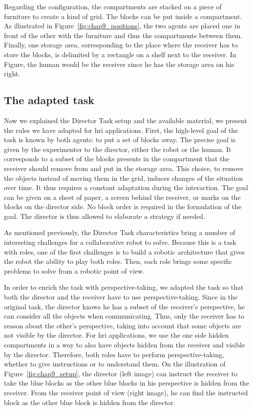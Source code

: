 Regarding the configuration, the compartments are stacked on a piece of furniture to create a kind of grid. The blocks can be put inside a compartment. As illustrated in Figure~\ref{fig:chap9_positions}, the two agents are placed one in front of the other with the furniture and thus the compartments between them. Finally, one storage area, corresponding to the place where the receiver has to store the blocks, is delimited by a rectangle on a shelf next to the receiver. In Figure, the human would be the receiver since he has the storage area on his right.

\subsection{The adapted task}

Now we explained the Director Task setup and the available material, we present the rules we have adapted for \acrshort{hri} applications. First, the high-level goal of the task is known by both agents: to put a set of blocks away. The precise goal is given by the experimenter to the director, either the robot or the human. It corresponds to a subset of the blocks presents in the compartment that the receiver should remove from and put in the storage area. This choice, to remove the objects instead of moving them in the grid, induces changes of the situation over time. It thus requires a constant adaptation during the interaction. The goal can be given on a sheet of paper, a screen behind the receiver, or marks on the blocks on the director side. No block order is required in the formulation of the goal. The director is thus allowed to elaborate a strategy if needed.

As mentioned previously, the Director Task characteristics bring a number of interesting challenges for a collaborative robot to solve. Because this is a task with roles, one of the first challenges is to build a robotic architecture that gives the robot the ability to play both roles. Then, each role brings some specific problems to solve from a robotic point of view.

In order to enrich the task with perspective-taking, we adapted the task so that both the director and the receiver have to use perspective-taking. Since in the original task, the director knows he has a subset of the receiver's perspective, he can consider all the objects when communicating. Thus, only the receiver has to reason about the other's perspective, taking into account that some objects are not visible by the director. For \acrshort{hri} applications, we use the one side hidden compartments in a way to also have objects hidden from the receiver and visible by the director. Therefore, both roles have to perform perspective-taking, whether to give instructions or to understand them. On the illustration of Figure~\ref{fig:chap9_setup}, the director (left image) can instruct the receiver to take the blue blocks as the other blue blocks in his perspective is hidden from the receiver. From the receiver point of view (right image), he can find the instructed block as the other blue block is hidden from the director.

